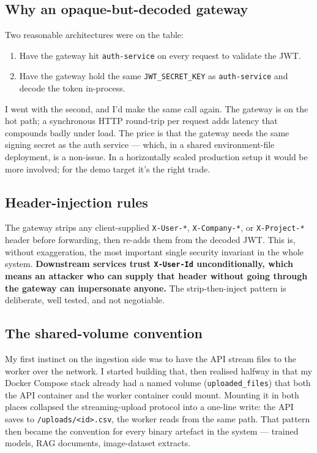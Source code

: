 \documentclass[12pt, a4paper]{report}
\begin{document}
\subsection{Why an opaque-but-decoded gateway}

Two reasonable architectures were on the table:

\begin{enumerate}
    \item Have the gateway hit \texttt{auth-service} on every
        request to validate the JWT.
    \item Have the gateway hold the same \texttt{JWT\_SECRET\_KEY}
        as \texttt{auth-service} and decode the token in-process.
\end{enumerate}

I went with the second, and I'd make the same call again. The gateway
is on the hot path; a synchronous HTTP round-trip per request adds
latency that compounds badly under load. The price is that the
gateway needs the same signing secret as the auth service --- which,
in a shared environment-file deployment, is a non-issue. In a
horizontally scaled production setup it would be more involved; for
the demo target it's the right trade.

\subsection{Header-injection rules}

The gateway strips any client-supplied \texttt{X-User-*},
\texttt{X-Company-*}, or \texttt{X-Project-*} header before
forwarding, then re-adds them from the decoded JWT. This is, without
exaggeration, the most important single security invariant in the
whole system. \textbf{Downstream services trust \texttt{X-User-Id}
unconditionally, which means an attacker who can supply that header
without going through the gateway can impersonate anyone.} The
strip-then-inject pattern is deliberate, well tested, and not
negotiable.

\subsection{The shared-volume convention}

My first instinct on the ingestion side was to have the API stream
files to the worker over the network. I started building that, then
realised halfway in that my Docker Compose stack already had a named
volume (\texttt{uploaded\_files}) that both the API container and the
worker container could mount. Mounting it in both places collapsed
the streaming-upload protocol into a one-line write: the API saves
to \texttt{/uploads/<id>.csv}, the worker reads from the same path.
That pattern then became the convention for every binary artefact in
the system --- trained models, RAG documents, image-dataset extracts.
\end{document}
